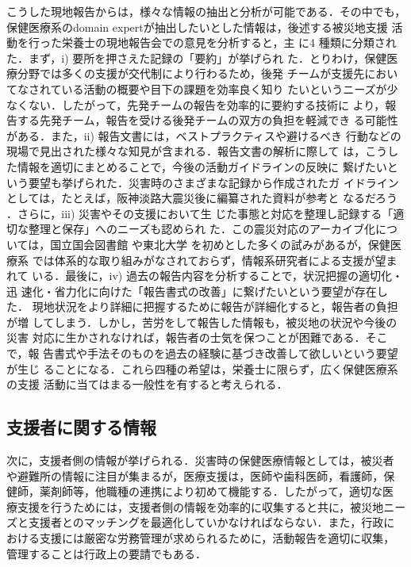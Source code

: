 \documentclass[japanese]{jnlp_1.4}
\begin{document}
こうした現地報告からは，様々な情報の抽出と分析が可能である．その中でも，
保健医療系のdomain expertが抽出したいとした情報は，後述する被災地支援
活動を行った栄養士の現地報告会\cite{sudo2012}での意見を分析すると，主
に4 種類に分類された．まず，i) 要所を押さえた記録の「要約」が挙げられ
た．とりわけ，保健医療分野では多くの支援が交代制により行わるため，後発
チームが支援先においてなされている活動の概要や目下の課題を効率良く知り
たいというニーズが少なくない．したがって，先発チームの報告を効率的に要約する技術に
より，報告する先発チーム，報告を受ける後発チームの双方の負担を軽減でき
る可能性がある．また，ii) 報告文書には，ベストプラクティスや避けるべき
行動などの現場で見出された様々な知見が含まれる．報告文書の解析に際して
は，こうした情報を適切にまとめることで，今後の活動ガイドラインの反映に
繋げたいという要望も挙げられた．災害時のさまざまな記録から作成されたガ
イドラインとしては，たとえば，阪神淡路大震災後に編纂された資料が参考と
なるだろう\cite{naikakufu1999} ．さらに，iii) 災害やその支援において生
じた事態と対応を整理し記録する「適切な整理と保存」へのニーズも認められ
た．この震災対応のアーカイブ化については，国立国会図書館\cite{ndl2012} 
や東北大学\cite{tohoku2012} を初めとした多くの試みがあるが，保健医療系
では体系的な取り組みがなされておらず，情報系研究者による支援が望まれて
いる．最後に，iv) 過去の報告内容を分析することで，状況把握の適切化・迅
速化・省力化に向けた「報告書式の改善」に繋げたいという要望が存在した．
現地状況をより詳細に把握するために報告が詳細化すると，報告者の負担が増
してしまう．しかし，苦労をして報告した情報も，被災地の状況や今後の災害
対応に生かされなければ，報告者の士気を保つことが困難である．そこで，報
告書式や手法そのものを過去の経験に基づき改善して欲しいという要望が生じ
ることになる．これら四種の希望は，栄養士に限らず，広く保健医療系の支援
活動に当てはまる一般性を有すると考えられる．

\subsection{支援者に関する情報}

次に，支援者側の情報が挙げられる．災害時の保健医療情報としては，被災者
や避難所の情報に注目が集まるが，医療支援は，医師や歯科医師，看護師，保
健師，薬剤師等，他職種の連携により初めて機能する．したがって，適切な医
療支援を行うためには，支援者側の情報を効率的に収集すると共に，被災地ニー
ズと支援者とのマッチングを最適化していかなければならない．また，行政に
おける支援には厳密な労務管理が求められるために，活動報告を適切に収集，
管理することは行政上の要請でもある．
\end{document}
